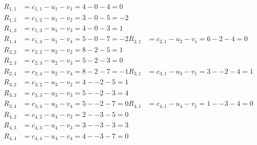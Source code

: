 \[
\begin{aligned}
R_{1,1} &= c_{1,1} - u_{1} - v_{1} = 4 - 0 - 4 = 0 \\
R_{1,2} &= c_{1,2} - u_{1} - v_{2} = 3 - 0 - 5 = -2 \\
R_{1,3} &= c_{1,3} - u_{1} - v_{3} = 4 - 0 - 3 = 1 \\
R_{1,4} &= c_{1,4} - u_{1} - v_{4} = 5 - 0 - 7 = -2 
R_{2,1} &= c_{2,1} - u_{2} - v_{1} = 6 - 2 - 4 = 0 \\
R_{2,2} &= c_{2,2} - u_{2} - v_{2} = 8 - 2 - 5 = 1 \\
R_{2,3} &= c_{2,3} - u_{2} - v_{3} = 5 - 2 - 3 = 0 \\
R_{2,4} &= c_{2,4} - u_{2} - v_{4} = 8 - 2 - 7 = -1 
R_{3,1} &= c_{3,1} - u_{3} - v_{1} = 3 - -2 - 4 = 1 \\
R_{3,2} &= c_{3,2} - u_{3} - v_{2} = 4 - -2 - 5 = 1 \\
R_{3,3} &= c_{3,3} - u_{3} - v_{3} = 5 - -2 - 3 = 4 \\
R_{3,4} &= c_{3,4} - u_{3} - v_{4} = 5 - -2 - 7 = 0 
R_{4,1} &= c_{4,1} - u_{4} - v_{1} = 1 - -3 - 4 = 0 \\
R_{4,2} &= c_{4,2} - u_{4} - v_{2} = 2 - -3 - 5 = 0 \\
R_{4,3} &= c_{4,3} - u_{4} - v_{3} = 3 - -3 - 3 = 3 \\
R_{4,4} &= c_{4,4} - u_{4} - v_{4} = 4 - -3 - 7 = 0 
\end{aligned}
\]

